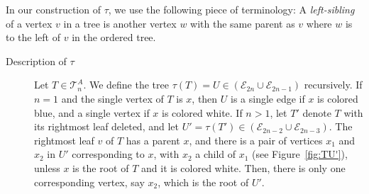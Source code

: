 \documentclass[12pt]{amsart}
\begin{document}
In our construction of $\tau$, we use the following piece of terminology:
    A \emph{left-sibling} of a vertex $v$ in a tree is another vertex $w$ with the same parent as $v$ where $w$ is to the left of $v$ in the ordered tree.
\begin{description}
    \item[Description of $\tau$] 
    Let $T\in\mathcal{T}_n^{A}$. We define the tree $\tau (T) = U\in \left(\mathcal{E}_{2n}\cup\mathcal{E}_{2n-1}\right)$ recursively. 
    If $n=1$ and the single vertex of $T$ is $x$, then $U$ is a single edge if $x$ is colored blue, and a single vertex if $x$ is colored white.
    If $n>1$, let $T'$ denote $T$ with its rightmost leaf deleted, and let $U' = \tau(T')\in\left(\mathcal{E}_{2n-2}\cup\mathcal{E}_{2n-3}\right)$.
    The rightmost leaf $v$ of $T$ has a parent $x$, and there is a pair of vertices $x_1$ and $x_2$ in $U'$ corresponding to $x$, with $x_2$ a child of $x_1$ (see Figure~\ref{fig:TU'}), unless $x$ is the root of $T$ and it is colored white. Then, there is only one corresponding vertex, say $x_2$, which is the root of $U'$.
    
    \begin{figure}[htbp]
\end{figure}
\end{description}
\end{document}

